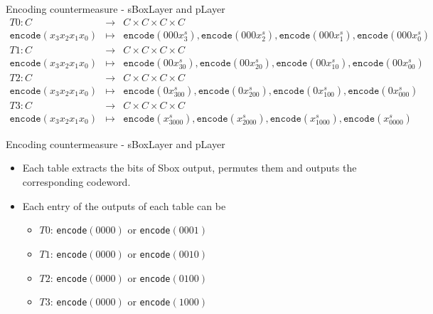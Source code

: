 \begin{frame}{Encoding countermeasure - sBoxLayer and pLayer}
\begin{eqnarray*}
T0:C &\to& C\times C\times C\times C\\
\texttt{encode}(x_3x_2x_1x_0) &\mapsto& \texttt{encode}(000x^s_3),\texttt{encode}(000x^s_2),\texttt{encode}(000x^s_1),\texttt{encode}(000x^s_0)
\end{eqnarray*}
\begin{eqnarray*}
T1:C &\to& C\times C\times C\times C\\
\texttt{encode}(x_3x_2x_1x_0) &\mapsto& \texttt{encode}(00x^s_30),\texttt{encode}(00x^s_20),\texttt{encode}(00x^s_10),\texttt{encode}(00x^s_00)
\end{eqnarray*}
\begin{eqnarray*}
T2:C &\to& C\times C\times C\times C\\
\texttt{encode}(x_3x_2x_1x_0) &\mapsto& \texttt{encode}(0x^s_300),\texttt{encode}(0x^s_200),\texttt{encode}(0x^s_100),\texttt{encode}(0x^s_000)
\end{eqnarray*}
\begin{eqnarray*}
T3:C &\to& C\times C\times C\times C\\
\texttt{encode}(x_3x_2x_1x_0) &\mapsto& \texttt{encode}(x^s_3000),\texttt{encode}(x^s_2000),\texttt{encode}(x^s_1000),\texttt{encode}(x^s_0000)
\end{eqnarray*}
\end{frame}

\begin{frame}{Encoding countermeasure - sBoxLayer and pLayer}
\begin{itemize}
    \item Each table extracts the bits of Sbox output, permutes them and outputs the corresponding codeword.
    \item Each entry of the outputs of each table can be 
    \begin{itemize}
        \item $T0$: \texttt{encode}$(0000)$ or
\texttt{encode}$(0001)$
\item $T1$: \texttt{encode}$(0000)$ or
\texttt{encode}$(0010)$
\item $T2$: \texttt{encode}$(0000)$ or
\texttt{encode}$(0100)$
\item $T3$: \texttt{encode}$(0000)$ or
\texttt{encode}$(1000)$
    \end{itemize}
\end{itemize}

\end{frame}


